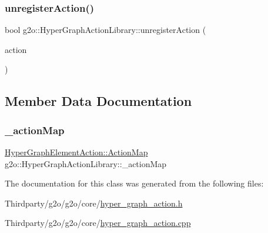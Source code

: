\mbox{\label{classg2o_1_1_hyper_graph_action_library_abe4c076e6734ffa79f6d2bff07f9fad5}} 
\subsubsection{\texorpdfstring{unregister\+Action()}{unregisterAction()}}
{\footnotesize\ttfamily bool g2o\+::\+Hyper\+Graph\+Action\+Library\+::unregister\+Action (\begin{DoxyParamCaption}\item[{\mbox{\hyperlink{classg2o_1_1_hyper_graph_element_action}{Hyper\+Graph\+Element\+Action}} $\ast$}]{action }\end{DoxyParamCaption})}



\subsection{Member Data Documentation}
\mbox{\label{classg2o_1_1_hyper_graph_action_library_afc9e9b39a743700dcfc896b50d176b3b}} 
\subsubsection{\texorpdfstring{\+\_\+action\+Map}{\_actionMap}}
{\footnotesize\ttfamily \mbox{\hyperlink{classg2o_1_1_hyper_graph_element_action_abc889fc90ae1bbb63d90c7993777417a}{Hyper\+Graph\+Element\+Action\+::\+Action\+Map}} g2o\+::\+Hyper\+Graph\+Action\+Library\+::\+\_\+action\+Map\hspace{0.3cm}{\ttfamily [protected]}}



The documentation for this class was generated from the following files\+:\begin{DoxyCompactItemize}
\item 
Thirdparty/g2o/g2o/core/\mbox{\hyperlink{hyper__graph__action_8h}{hyper\+\_\+graph\+\_\+action.\+h}}\item 
Thirdparty/g2o/g2o/core/\mbox{\hyperlink{hyper__graph__action_8cpp}{hyper\+\_\+graph\+\_\+action.\+cpp}}\end{DoxyCompactItemize}
